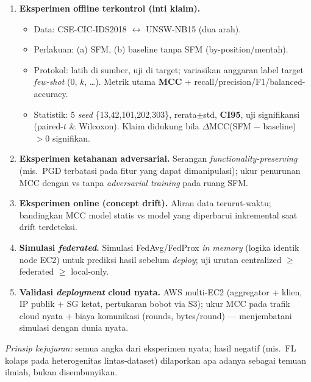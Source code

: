 \documentclass[11pt,a4paper]{article}
\begin{document}
\begin{enumerate}[label=\textbf{\arabic*.},leftmargin=2.2em]
  \item \textbf{Eksperimen offline terkontrol (inti klaim).}
  \begin{itemize}[leftmargin=1.3em]
    \item Data: CSE-CIC-IDS2018 $\leftrightarrow$ UNSW-NB15 (dua arah).
    \item Perlakuan: (a) SFM, (b) baseline tanpa SFM (by-position/mentah).
    \item Protokol: latih di sumber, uji di target; variasikan anggaran label
    target \emph{few-shot} (0, $k$, \dots). Metrik utama \textbf{MCC} +
    recall/precision/F1/balanced-accuracy.
    \item Statistik: 5 \emph{seed} \{13,42,101,202,303\}, rerata$\pm$std,
    \textbf{CI95}, uji signifikansi (paired-$t$ \& Wilcoxon). Klaim didukung
    bila $\Delta$MCC(SFM $-$ baseline) $>0$ signifikan.
  \end{itemize}

  \item \textbf{Eksperimen ketahanan adversarial.} Serangan
  \emph{functionality-preserving} (mis.\ PGD terbatasi pada fitur yang dapat
  dimanipulasi); ukur penurunan MCC dengan vs tanpa \emph{adversarial training}
  pada ruang SFM.

  \item \textbf{Eksperimen online (concept drift).} Aliran data terurut-waktu;
  bandingkan MCC model statis vs model yang diperbarui inkremental saat drift
  terdeteksi.

  \item \textbf{Simulasi \emph{federated}.} Simulasi FedAvg/FedProx \emph{in
  memory} (logika identik node EC2) untuk prediksi hasil sebelum \emph{deploy};
  uji urutan centralized $\ge$ federated $\ge$ local-only.

  \item \textbf{Validasi \emph{deployment} cloud nyata.} AWS multi-EC2
  (aggregator + klien, IP publik + SG ketat, pertukaran bobot via S3); ukur MCC
  pada trafik cloud nyata + biaya komunikasi (rounds, bytes/round) --- menjembatani
  simulasi dengan dunia nyata.
\end{enumerate}

\noindent\textit{Prinsip kejujuran:} semua angka dari eksperimen nyata; hasil
negatif (mis.\ FL kolaps pada heterogenitas lintas-dataset) dilaporkan apa
adanya sebagai temuan ilmiah, bukan disembunyikan.

\end{document}
